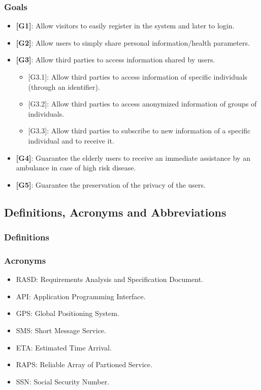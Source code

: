 \documentclass[12pt,a4paper]{article}
\begin{document}
	\subsubsection{Goals}
	\begin{itemize}
		\item {\textbf[}\textbf{G1}{\textbf]}: Allow visitors to easily register in the system and later to login.
		\item {\textbf[}\textbf{G2}{\textbf]}: Allow users to simply share personal information/health parameters.
		\item {\textbf[}\textbf{G3}{\textbf]}: Allow third parties to access information shared by users.
		\begin{itemize}
			\item {[G3.1]}: Allow third parties to access information of specific individuals (through an identifier).
			\item {[G3.2]}: Allow third parties to access anonymized information of groups of individuals.
			\item {[G3.3]}: Allow third parties to subscribe to new information of a specific individual and to receive it.
		\end{itemize}
		\item {\textbf[}\textbf{G4}{\textbf]}: Guarantee the elderly users to receive an immediate assistance by an ambulance in case of high risk disease.
		\item {\textbf[}\textbf{G5}{\textbf]}: Guarantee the preservation of the privacy of the users.
	\end{itemize}
	
	
	\subsection{Definitions, Acronyms and Abbreviations}
	\subsubsection{Definitions}
	\subsubsection{Acronyms}
	\begin{itemize}
		\item RASD: Requirements Analysis and Specification Document.
		\item API: Application Programming Interface.
		\item GPS: Global Positioning System.
		\item SMS: Short Message Service. 
		\item ETA: Estimated Time Arrival.
		\item RAPS: Reliable Array of Partioned Service.
		\item SSN: Social Security Number.
	\end{itemize}
\end{document}
